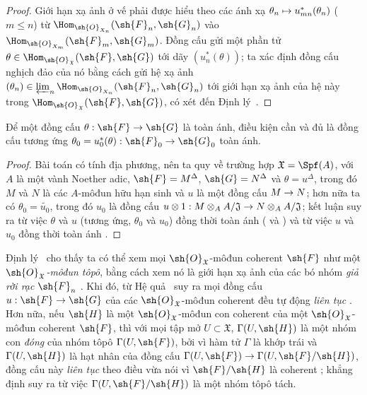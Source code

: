 \documentclass[oneside]{amsart}
\makeatletter
\renewcommand{\leq}{\leqslant}
\newcommand{\ega@arrow}[2]{\mathchoice{#1}{#2}{#2}{#2}}
\let\ega@shortmapsto\mapsto
\renewcommand{\to}{\ega@arrow{\longrightarrow}{\rightarrow}}
\renewcommand{\mapsto}{\ega@arrow{\longmapsto}{\ega@shortmapsto}}
\newcommand{\oldpage}[2][]{{\marginnote{\normalfont\textbf{#1}~|~#2}}\ignorespaces}
\let\EGAOriginalLabel\label
\renewcommand{\label}[1]{\phantomsection\EGAOriginalLabel{#1}}
\makeatother
\begin{document}
\begin{proof}
Giới hạn xạ ảnh ở vế phải được hiểu theo các ánh xạ $\theta_n\mapsto u_{mn}^*(\theta_n)$ ($m\leq n$) từ $\Hom_{\sh{O}_{X_n}}(\sh{F}_n,\sh{G}_n)$ vào $\Hom_{\sh{O}_{X_m}}(\sh{F}_m,\sh{G}_m)$.
Đồng cấu  gửi một phần tử $\theta\in\Hom_{\sh{O}_\mathfrak{X}}(\sh{F},\sh{G})$ tới dãy $(u_n^*(\theta))$; ta xác định đồng cấu nghịch đảo của nó bằng cách gửi hệ xạ ảnh $(\theta_n)\in\varprojlim_n\Hom_{\sh{O}_{X_n}}(\sh{F}_n,\sh{G}_n)$ tới giới hạn xạ ảnh của hệ này trong $\Hom_{\sh{O}_\mathfrak{X}}(\sh{F},\sh{G})$, có xét đến Định lý~.
\end{proof}

\begin{corollary}[10.11.5]
\label{I.10.11.5}
Để một đồng cấu $\theta:\sh{F}\to\sh{G}$ là toàn ánh, điều kiện cần và đủ là đồng cấu tương ứng $\theta_0=u_0^*(\theta):\sh{F}_0\to\sh{G}_0$ toàn ánh.
\end{corollary}

\begin{proof}
Bài toán có tính địa phương, nên ta quy về trường hợp $\mathfrak{X}=\Spf(A)$, với $A$ là một vành Noether adic, $\sh{F}=M^\Delta$, $\sh{G}=N^\Delta$ và $\theta=u^\Delta$, trong đó $M$ và $N$ là các $A$-môđun hữu hạn sinh và $u$ là một đồng cấu $M\to N$; hơn nữa ta có $\theta_0=\widetilde{u_0}$, trong đó $u_0$ là đồng cấu $u\otimes 1:M\otimes_A A/\mathfrak{J}\to N\otimes_A A/\mathfrak{J}$; kết luận suy ra từ việc $\theta$ và $u$ (tương ứng, $\theta_0$ và $u_0$) đồng thời toàn ánh ( và ) và từ việc $u$ và $u_0$ đồng thời toàn ánh .
\end{proof}

\begin{env}[10.11.6]
\label{I.10.11.6}
Định lý~ cho thấy ta có thể xem mọi $\sh{O}_\mathfrak{X}$-môđun coherent $\sh{F}$ như một \emph{$\sh{O}_\mathfrak{X}$-môđun tôpô}, bằng cách xem nó là giới hạn xạ ảnh của các bó nhóm \emph{giả rời rạc} $\sh{F}_n$ .
Khi đó, từ Hệ quả~ suy ra mọi đồng cấu $u:\sh{F}\to\sh{G}$ của các $\sh{O}_\mathfrak{X}$-môđun coherent đều tự động \emph{liên tục}
\oldpage[I]{205}
.
Hơn nữa, nếu $\sh{H}$ là một $\sh{O}_\mathfrak{X}$-môđun con coherent của một $\sh{O}_\mathfrak{X}$-môđun coherent $\sh{F}$, thì với mọi tập mở $U\subset\mathfrak{X}$, $\Gamma(U,\sh{H})$ là một nhóm con \emph{đóng} của nhóm tôpô $\Gamma(U,\sh{F})$, bởi vì hàm tử $\Gamma$ là khớp trái và $\Gamma(U,\sh{H})$ là hạt nhân của đồng cấu $\Gamma(U,\sh{F})\to\Gamma(U,\sh{F}/\sh{H})$, đồng cấu này \emph{liên tục} theo điều vừa nói vì $\sh{F}/\sh{H}$ là coherent ; khẳng định suy ra từ việc $\Gamma(U,\sh{F}/\sh{H})$ là một nhóm tôpô tách.
\end{env}
\end{document}

